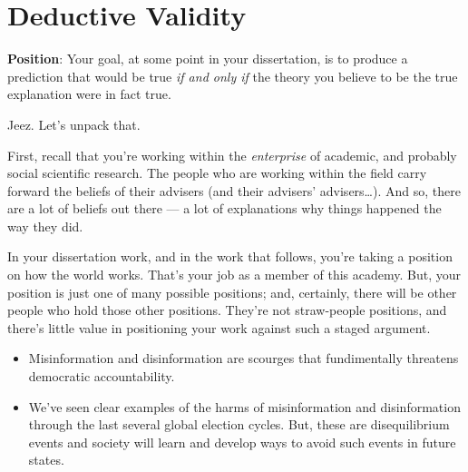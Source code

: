 \documentclass[
  letterpaper,
  DIV=11,
  numbers=noendperiod]{scrreprt}
\begin{document}
\section{Deductive Validity}\label{deductive-validity}

\textbf{Position}: Your goal, at some point in your dissertation, is to
produce a prediction that would be true \emph{if and only if} the theory
you believe to be the true explanation were in fact true.

Jeez. Let's unpack that.

First, recall that you're working within the \emph{enterprise} of
academic, and probably social scientific research. The people who are
working within the field carry forward the beliefs of their advisers
(and their advisers' advisers\ldots). And so, there are a lot of beliefs
out there --- a lot of explanations why things happened the way they
did.

In your dissertation work, and in the work that follows, you're taking a
position on how the world works. That's your job as a member of this
academy. But, your position is just one of many possible positions; and,
certainly, there will be other people who hold those other positions.
They're not straw-people positions, and there's little value in
positioning your work against such a staged argument.

\begin{tcolorbox}[enhanced jigsaw, titlerule=0mm, colback=white, toptitle=1mm, toprule=.15mm, bottomtitle=1mm, colframe=quarto-callout-note-color-frame, colbacktitle=quarto-callout-note-color!10!white, bottomrule=.15mm, leftrule=.75mm, opacityback=0, title=\textcolor{quarto-callout-note-color}{\faInfo}\hspace{0.5em}{Examples of Differing Positions}, opacitybacktitle=0.6, arc=.35mm, rightrule=.15mm, breakable, coltitle=black, left=2mm]

\begin{itemize}
\item
  Misinformation and disinformation are scourges that fundimentally
  threatens democratic accountability.
\item
  We've seen clear examples of the harms of misinformation and
  disinformation through the last several global election cycles. But,
  these are disequilibrium events and society will learn and develop
  ways to avoid such events in future states.
\end{itemize}

\end{tcolorbox}
\end{document}
